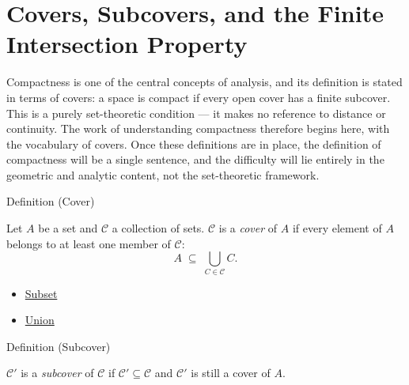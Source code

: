 
\section{Covers, Subcovers, and the Finite Intersection Property}


\begin{exposition}
Compactness is one of the central concepts of analysis, and its definition is
stated in terms of covers: a space is compact if every open cover has a finite
subcover. This is a purely set-theoretic condition — it makes no reference to
distance or continuity. The work of understanding compactness therefore begins
here, with the vocabulary of covers. Once these definitions are in place, the
definition of compactness will be a single sentence, and the difficulty will
lie entirely in the geometric and analytic content, not the set-theoretic
framework.
\end{exposition}


\begin{definitionbox}{Definition (Cover)}
\begin{definition}[Cover]\label{def:cover-full}
Let $A$ be a set and $\mathcal{C}$ a collection of sets.
$\mathcal{C}$ is a \emph{cover} of $A$ if every element of $A$ belongs to
at least one member of $\mathcal{C}$:
\[
A \;\subseteq\; \bigcup_{C \in \mathcal{C}} C.
\]
\end{definition}
\end{definitionbox}

\begin{dependencies}
\begin{itemize}
  \item \hyperref[def:subset]{Subset}
  \item \hyperref[def:union]{Union}
\end{itemize}
\end{dependencies}

\begin{definitionbox}{Definition (Subcover)}
\begin{definition}[Subcover]\label{def:subcover}
$\mathcal{C}'$ is a \emph{subcover} of $\mathcal{C}$ if $\mathcal{C}'
\subseteq \mathcal{C}$ and $\mathcal{C}'$ is still a cover of $A$.
\end{definition}
\end{definitionbox}

